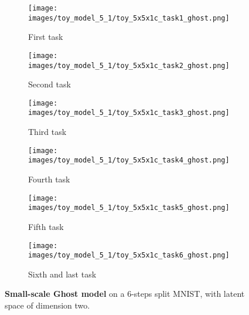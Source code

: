 \begin{figure}
    \centering
    \begin{subfigure}{.33\textwidth}
        \centering
        \texttt{[image: images/toy\_model\_5\_1/toy\_5x5x1c\_task1\_ghost.png]}
        \caption{First task}
        \label{fig:ghost_toy_6steps_ghost_1}
    \end{subfigure}%
    \begin{subfigure}{.33\textwidth}
        \centering
        \texttt{[image: images/toy\_model\_5\_1/toy\_5x5x1c\_task2\_ghost.png]}
        \caption{Second task}
        \label{fig:ghost_toy_6steps_ghost_2}
    \end{subfigure}
    \begin{subfigure}{.33\textwidth}
        \centering
        \texttt{[image: images/toy\_model\_5\_1/toy\_5x5x1c\_task3\_ghost.png]}
        \caption{Third task}
        \label{fig:ghost_toy_6steps_ghost_3}
    \end{subfigure}

    \begin{subfigure}{.33\textwidth}
        \centering
        \texttt{[image: images/toy\_model\_5\_1/toy\_5x5x1c\_task4\_ghost.png]}
        \caption{Fourth task}
        \label{fig:ghost_toy_6steps_ghost_4}
    \end{subfigure}
    \begin{subfigure}{.33\textwidth}
        \centering
        \texttt{[image: images/toy\_model\_5\_1/toy\_5x5x1c\_task5\_ghost.png]}
        \caption{Fifth task}
        \label{fig:ghost_toy_6steps_ghost_5}
    \end{subfigure}
    \begin{subfigure}{.30\textwidth}
        \centering
        \texttt{[image: images/toy\_model\_5\_1/toy\_5x5x1c\_task6\_ghost.png]}
        \caption{Sixth and last task}
        \label{fig:ghost_toy_6steps_ghost_6}
    \end{subfigure}

    \caption{\textbf{Small-scale Ghost model} on a 6-steps split MNIST, with latent space of dimension two.}
    \label{fig:ghost_toy_6steps_ghost}
\end{figure}

